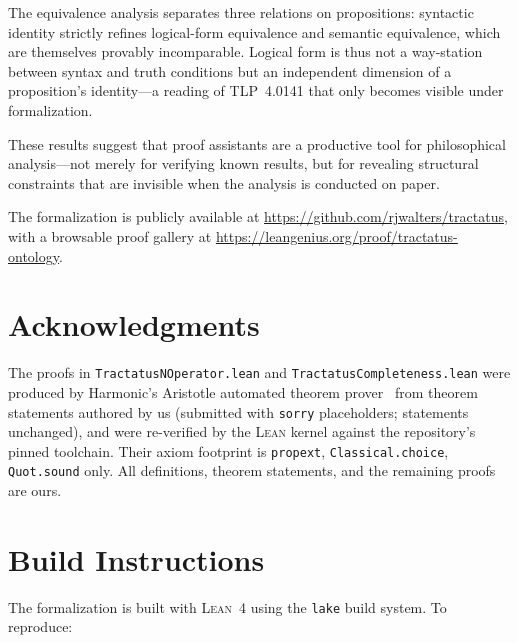 \documentclass[10pt, letterpaper]{article}
\theoremstyle{definition}
\theoremstyle{remark}
\newcommand{\Lean}{\textsc{Lean}}
\begin{document}
The equivalence analysis separates three relations on
propositions: syntactic identity strictly refines logical-form
equivalence and semantic equivalence, which are themselves
provably incomparable.  Logical form is thus not a way-station
between syntax and truth conditions but an independent dimension
of a proposition's identity---a reading of TLP~4.0141 that only
becomes visible under formalization.

These results suggest that proof assistants are a productive tool
for philosophical analysis---not merely for verifying known
results, but for revealing structural constraints that are
invisible when the analysis is conducted on paper.

The formalization is publicly available at
\url{https://github.com/rjwalters/tractatus}, with a
browsable proof gallery at
\url{https://leangenius.org/proof/tractatus-ontology}.

\section*{Acknowledgments}

The proofs in \texttt{TractatusNOperator.lean} and
\texttt{TractatusCompleteness.lean} were produced by Harmonic's
Aristotle automated theorem prover~\cite{harmonic2026} from
theorem statements authored by us (submitted with \texttt{sorry}
placeholders; statements unchanged), and were re-verified by the
\Lean{} kernel against the repository's pinned toolchain.  Their
axiom footprint is \texttt{propext}, \texttt{Classical.choice},
\texttt{Quot.sound} only.  All definitions, theorem statements,
and the remaining proofs are ours.


\appendix

\section{Build Instructions}
\label{app:build}

The formalization is built with \Lean~4 using the \texttt{lake}
build system.  To reproduce:
\end{document}
